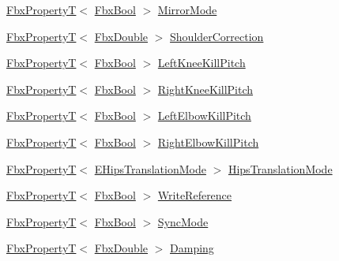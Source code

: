 \begin{DoxyCompactItemize}
\item 
\hyperlink{class_fbx_property_t}{Fbx\+PropertyT}$<$ \hyperlink{fbxtypes_8h_a92e0562b2fe33e76a242f498b362262e}{Fbx\+Bool} $>$ \hyperlink{class_fbx_character_a68d6080dfb8f35af92d28760d40dccdf}{Mirror\+Mode}
\item 
\hyperlink{class_fbx_property_t}{Fbx\+PropertyT}$<$ \hyperlink{fbxtypes_8h_a171e72a1c46fc15c1a6c9c31948c1c5b}{Fbx\+Double} $>$ \hyperlink{class_fbx_character_a970018e5956d90bc16b309a23e6ab081}{Shoulder\+Correction}
\item 
\hyperlink{class_fbx_property_t}{Fbx\+PropertyT}$<$ \hyperlink{fbxtypes_8h_a92e0562b2fe33e76a242f498b362262e}{Fbx\+Bool} $>$ \hyperlink{class_fbx_character_afd58feb02aeb1bc42fc0e367e3a51404}{Left\+Knee\+Kill\+Pitch}
\item 
\hyperlink{class_fbx_property_t}{Fbx\+PropertyT}$<$ \hyperlink{fbxtypes_8h_a92e0562b2fe33e76a242f498b362262e}{Fbx\+Bool} $>$ \hyperlink{class_fbx_character_ac52d41bf76dd4a9cddf41e7bf465590d}{Right\+Knee\+Kill\+Pitch}
\item 
\hyperlink{class_fbx_property_t}{Fbx\+PropertyT}$<$ \hyperlink{fbxtypes_8h_a92e0562b2fe33e76a242f498b362262e}{Fbx\+Bool} $>$ \hyperlink{class_fbx_character_a9192ea2f1abda7959f6015c26f6b2cdb}{Left\+Elbow\+Kill\+Pitch}
\item 
\hyperlink{class_fbx_property_t}{Fbx\+PropertyT}$<$ \hyperlink{fbxtypes_8h_a92e0562b2fe33e76a242f498b362262e}{Fbx\+Bool} $>$ \hyperlink{class_fbx_character_af81b691ddd65a26b867160ab3a8d57c2}{Right\+Elbow\+Kill\+Pitch}
\item 
\hyperlink{class_fbx_property_t}{Fbx\+PropertyT}$<$ \hyperlink{class_fbx_character_a908e56db46ed8467b779dbf39ec30952}{E\+Hips\+Translation\+Mode} $>$ \hyperlink{class_fbx_character_aa1b3da64538ec9daaf50daab0bf77b1f}{Hips\+Translation\+Mode}
\item 
\hyperlink{class_fbx_property_t}{Fbx\+PropertyT}$<$ \hyperlink{fbxtypes_8h_a92e0562b2fe33e76a242f498b362262e}{Fbx\+Bool} $>$ \hyperlink{class_fbx_character_a2c1620d6f4dc641672afb3243ae008c3}{Write\+Reference}
\item 
\hyperlink{class_fbx_property_t}{Fbx\+PropertyT}$<$ \hyperlink{fbxtypes_8h_a92e0562b2fe33e76a242f498b362262e}{Fbx\+Bool} $>$ \hyperlink{class_fbx_character_abb7013de6c9f5f810e869f0111b1912c}{Sync\+Mode}
\item 
\hyperlink{class_fbx_property_t}{Fbx\+PropertyT}$<$ \hyperlink{fbxtypes_8h_a171e72a1c46fc15c1a6c9c31948c1c5b}{Fbx\+Double} $>$ \hyperlink{class_fbx_character_a05726b4bade54e987f3581ad1ec31c73}{Damping}

\end{DoxyCompactItemize}
